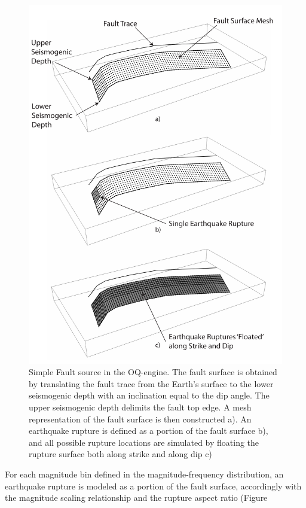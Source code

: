 \begin{figure}
\centering
\includegraphics[width=14cm]{./Pictures/SimpleFaultSource.pdf}
\caption{Simple Fault source in the OQ-engine. The fault surface is obtained by
translating the fault trace from the Earth's surface to the lower seismogenic
depth with an inclination equal to the dip angle. The upper seismogenic depth
delimits the fault top edge. A mesh representation of the fault surface is then
constructed a). An earthquake rupture is defined as a portion of the fault
surface b), and all possible rupture locations are simulated by floating the
rupture surface both along strike and along dip c)}
\label{fig:SimpleFaultSource}
\end{figure}
For each magnitude bin defined in the magnitude-frequency distribution, an
earthquake rupture is modeled as a portion of the fault surface, accordingly
with the magnitude scaling relationship and the rupture aspect ratio (Figure
